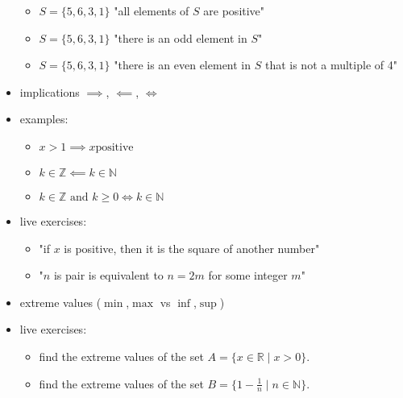 \documentclass[a4paper,12pt]{article}
\providecommand{\tightlist}{\setlength{\itemsep}{0pt}\setlength{\parskip}{0pt}}
\newcommand{\N}{\mathbb{N}}
\newcommand{\Z}{\mathbb{Z}}
\newcommand{\R}{\mathbb{R}}
\newcommand{\txtand}{\text{ and }}
\begin{document}
\begin{itemize}
	\begin{itemize}
		\tightlist
		\item
		\(S = \{5,6,3,1\}\) "all elements of \(S\) are positive"
		\item
		\(S = \{5,6,3,1\}\) "there is an odd element in \(S\)"
		\item
		\(S = \{5,6,3,1\}\) "there is an even element in \(S\) that is not a
		multiple of 4"
	\end{itemize}
	\item
	implications \(\implies\), \(\impliedby\), \(\iff\)
	\item
	examples:
	
	\begin{itemize}
		\tightlist
		\item
		\(x>1 \implies x \text{positive}\)
		\item
		\(k \in \Z \impliedby k \in \N\)
		\item
		\(k \in \Z  \txtand k\geq 0 \iff k \in \N\)
	\end{itemize}
	\item
	live exercises:
	
	\begin{itemize}
		\tightlist
		\item
		"if \(x\) is positive, then it is the square of another number"
		\item
		"\(n\) is pair is equivalent to \(n=2m\) for some integer \(m\)"
	\end{itemize}
	\item
	extreme values (\(\min\),\(\max\) vs \(\inf\),\(\sup\))
	\item
	live exercises:
	
	\begin{itemize}
		\tightlist
		\item
		find the extreme values of the set \(A = \{x \in \R \mid x>0\}\).
		\item
		find the extreme values of the set
		\(B = \{1-\frac{1}{n} \mid n\in \N\}\).
	\end{itemize}
	\end{itemize}
	
	
	
	
	
	
	
	
	
\end{document}
